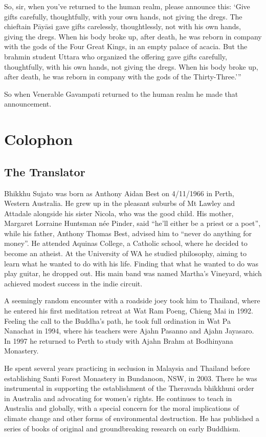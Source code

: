 \documentclass[12pt,openany]{book}%
\let\oldbackmatter\backmatter
\renewcommand{\backmatter}{%
\chapterfont{\setstretch{.85}\normalfont\centering}%
\sectionfont{\setstretch{.85}\Semiboldsubheadfont}%
\oldbackmatter}
\begin{document}
So, sir, when you’ve returned to the human realm, please announce this: ‘Give gifts carefully, thoughtfully, with your own hands, not giving the dregs. The chieftain \textsanskrit{Pāyāsi} gave gifts carelessly, thoughtlessly, not with his own hands, giving the dregs. When his body broke up, after death, he was reborn in company with the gods of the Four Great Kings, in an empty palace of acacia. But the brahmin student Uttara who organized the offering gave gifts carefully, thoughtfully, with his own hands, not giving the dregs. When his body broke up, after death, he was reborn in company with the gods of the Thirty-Three.’” 

So when Venerable Gavampati returned to the human realm he made that announcement. 

%
\backmatter%
\chapter*{Colophon}

\section*{The Translator}

Bhikkhu Sujato was born as Anthony Aidan Best on 4/11/1966 in Perth, Western Australia. He grew up in the pleasant suburbs of Mt Lawley and Attadale alongside his sister Nicola, who was the good child. His mother, Margaret Lorraine Huntsman née Pinder, said “he’ll either be a priest or a poet”, while his father, Anthony Thomas Best, advised him to “never do anything for money”. He attended Aquinas College, a Catholic school, where he decided to become an atheist. At the University of WA he studied philosophy, aiming to learn what he wanted to do with his life. Finding that what he wanted to do was play guitar, he dropped out. His main band was named Martha’s Vineyard, which achieved modest success in the indie circuit. 

A seemingly random encounter with a roadside joey took him to Thailand, where he entered his first meditation retreat at Wat Ram Poeng, Chieng Mai in 1992. Feeling the call to the Buddha’s path, he took full ordination in Wat Pa Nanachat in 1994, where his teachers were Ajahn Pasanno and Ajahn Jayasaro. In 1997 he returned to Perth to study with Ajahn Brahm at Bodhinyana Monastery. 

He spent several years practicing in seclusion in Malaysia and Thailand before establishing Santi Forest Monastery in Bundanoon, NSW, in 2003. There he was instrumental in supporting the establishment of the Theravada bhikkhuni order in Australia and advocating for women’s rights. He continues to teach in Australia and globally, with a special concern for the moral implications of climate change and other forms of environmental destruction. He has published a series of books of original and groundbreaking research on early Buddhism. 
\end{document}
